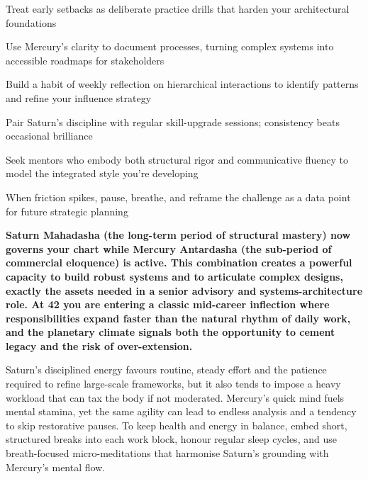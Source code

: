 \begin{diamondlist}
  \item {\fontsize{8.5}{12}\selectfont Treat early setbacks as deliberate practice drills that harden your architectural foundations}
  \item {\fontsize{8.5}{12}\selectfont Use Mercury's clarity to document processes, turning complex systems into accessible roadmaps for stakeholders}
  \item {\fontsize{8.5}{12}\selectfont Build a habit of weekly reflection on hierarchical interactions to identify patterns and refine your influence strategy}
  \item {\fontsize{8.5}{12}\selectfont Pair Saturn's discipline with regular skill-upgrade sessions; consistency beats occasional brilliance}
  \item {\fontsize{8.5}{12}\selectfont Seek mentors who embody both structural rigor and communicative fluency to model the integrated style you're developing}
  \item {\fontsize{8.5}{12}\selectfont When friction spikes, pause, breathe, and reframe the challenge as a data point for future strategic planning}
\end{diamondlist}


\label{topic39}

{\fontsize{9.5}{13.8}\selectfont\bfseries\color{DeepSlate} Saturn Mahadasha (the long-term period of structural mastery) now governs your chart while Mercury Antardasha (the sub-period of commercial eloquence) is active. This combination creates a powerful capacity to build robust systems and to articulate complex designs, exactly the assets needed in a senior advisory and systems-architecture role. At 42 you are entering a classic mid-career inflection where responsibilities expand faster than the natural rhythm of daily work, and the planetary climate signals both the opportunity to cement legacy and the risk of over-extension.}\par\vspace{2mm}

{\fontsize{9}{13}\selectfont Saturn's disciplined energy favours routine, steady effort and the patience required to refine large-scale frameworks, but it also tends to impose a heavy workload that can tax the body if not moderated. Mercury's quick mind fuels mental stamina, yet the same agility can lead to endless analysis and a tendency to skip restorative pauses. To keep health and energy in balance, embed short, structured breaks into each work block, honour regular sleep cycles, and use breath-focused micro-meditations that harmonise Saturn's grounding with Mercury's mental flow.}\par\vspace{1.8mm}

